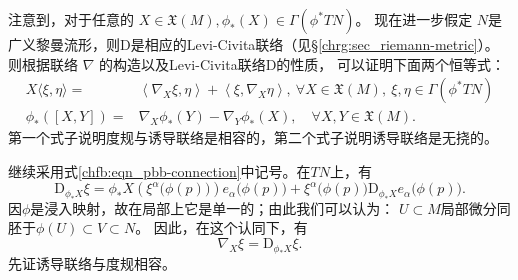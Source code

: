 注意到，对于任意的 $X \in \mathfrak{X}(M), \phi_*(X) \in \Gamma(\phi^* T N)$。
现在进一步假定 $N$是广义黎曼流形，则$\mathrm{D}$是相应的Levi-Civita联络（见\S\ref{chrg:sec_riemann-metric}）。
则根据联络 $\nabla$ 的构造以及Levi-Civita联络$\mathrm{D}$的性质，
可以证明下面两个恒等式：
\begin{align}
    X\langle\xi, \eta\rangle= &\left\langle\nabla_X \xi, \eta\right\rangle+\left\langle\xi,
     \nabla_X \eta\right\rangle, \ \forall X \in \mathfrak{X}(M),\ \xi, \eta \in \Gamma(\phi^* T N) 
     \label{chfb:eqn_induce-con-compatibility} \\
    \phi_*([X, Y])=&\nabla_X \phi_*(Y)-\nabla_Y \phi_*(X), \quad \forall X, Y \in \mathfrak{X}(M) .
    \label{chfb:eqn_induce-con-NoTorsion}
\end{align}
第一个式子说明度规与诱导联络是相容的，第二个式子说明诱导联络是无挠的。


继续采用式\eqref{chfb:eqn_pbb-connection}中记号。在$TN$上，有 %
\begin{equation}\label{chfb:eqn_pbb-tmpN}
    \mathrm{D}_{\phi_*X} \xi = \phi_{*}X\left(\xi^\alpha \bigl(\phi(p)\bigr) \right) e_\alpha\bigl(\phi(p)\bigr)
    +\xi^\alpha\bigl(\phi(p)\bigr) \mathrm{D}_{\phi_*X} e_\alpha\bigl(\phi(p)\bigr).
\end{equation}
因$\phi$是浸入映射，故在局部上它是单一的；由此我们可以认为：
$U\subset M$局部微分同胚于$\phi(U)\subset V \subset N$。
因此，在这个认同下，有
\begin{equation}
    \nabla_X \xi = \mathrm{D}_{\phi_*X} \xi .
\end{equation}
先证诱导联络与度规相容。

